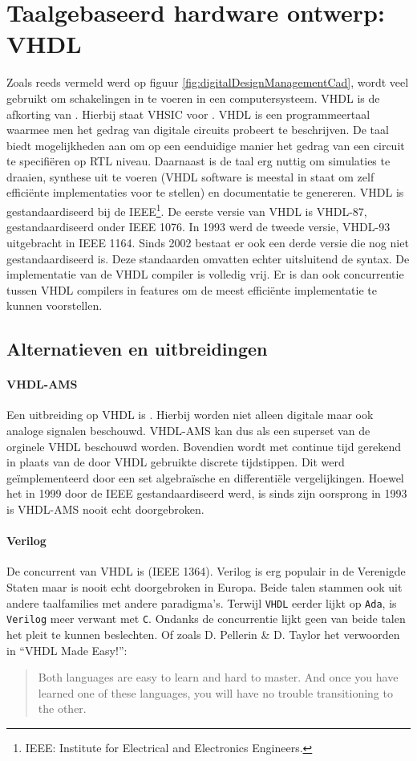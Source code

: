 \section{Taalgebaseerd hardware ontwerp: VHDL}
\label{s:vhdl}
Zoals reeds vermeld werd op figuur \ref{fig:digitalDesignManagementCad}, wordt  veel gebruikt om schakelingen in te voeren in een computersysteem. VHDL is de afkorting van . Hierbij staat VHSIC voor . VHDL is een programmeertaal waarmee men het gedrag van digitale circuits probeert te beschrijven. De taal biedt mogelijkheden aan om op een eenduidige manier het gedrag van een circuit te specifi\"eren op RTL niveau. Daarnaast is de taal erg nuttig om simulaties te draaien, synthese uit te voeren (VHDL software is meestal in staat om zelf effici\"ente implementaties voor te stellen) en documentatie te genereren. VHDL is gestandaardiseerd bij de IEEE\footnote{IEEE: Institute for Electrical and Electronics Engineers.}. De eerste versie van VHDL is VHDL-87, gestandaardiseerd onder IEEE 1076. In 1993 werd de tweede versie, VHDL-93 uitgebracht in IEEE 1164. Sinds 2002 bestaat er ook een derde versie die nog niet gestandaardiseerd is. Deze standaarden omvatten echter uitsluitend de syntax. De implementatie van de VHDL compiler is volledig vrij. Er is dan ook concurrentie tussen VHDL compilers in features om de meest effici\"ente implementatie te kunnen voorstellen.
\subsection{Alternatieven en uitbreidingen}
\paragraph{VHDL-AMS}Een uitbreiding op VHDL is . Hierbij worden niet alleen digitale maar ook analoge signalen beschouwd. VHDL-AMS kan dus als een superset van de orginele VHDL beschouwd worden. Bovendien wordt met continue tijd gerekend in plaats van de door VHDL gebruikte discrete tijdstippen. Dit werd ge\"implementeerd door een set algebra\"ische en differenti\"ele vergelijkingen. Hoewel het in 1999 door de IEEE gestandaardiseerd werd, is sinds zijn oorsprong in 1993 is VHDL-AMS nooit echt doorgebroken.
\paragraph{Verilog}De concurrent van VHDL is  (IEEE 1364). Verilog is erg populair in de Verenigde Staten maar is nooit echt doorgebroken in Europa. Beide talen stammen ook uit andere taalfamilies met andere paradigma's. Terwijl \verb+VHDL+ eerder lijkt op \verb+Ada+, is \verb+Verilog+ meer verwant met \verb+C+. Ondanks de concurrentie lijkt geen van beide talen het pleit te kunnen beslechten. Of zoals D. Pellerin \& D. Taylor het verwoorden in ``VHDL Made Easy!''\cite{pellerin1997vhdl}:
\begin{quote}
Both languages are easy to learn and hard to master. And once you have learned one of these languages, you will have no trouble transitioning to the other.
\end{quote}
